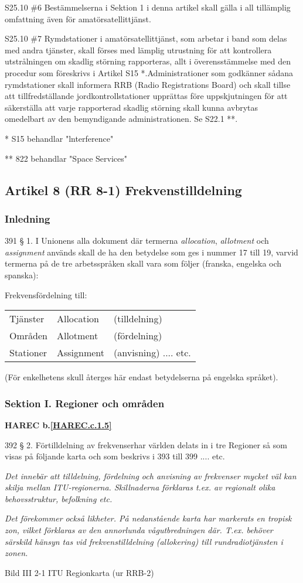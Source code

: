 S25.10 \#6 Bestämmelserna i Sektion 1 i denna artikel skall gälla i all
tillämplig omfattning även för amatörsatellittjänst.

S25.10 \#7 Rymdstationer i amatörsatellittjänst, som arbetar i band som
delas med andra tjänster, skall förses med lämplig utrustning för att
kontrollera utstrålningen om skadlig störning rapporteras, allt i
överensstämmelse med den procedur som föreskrivs i Artikel S15
*.Administrationer som godkänner sådana rymdstationer skall informera
RRB (Radio Registrations Board) och skall tillse att tillfredställande
jordkontrollstationer upprättas före uppskjutningen för att
säkerställa att varje rapporterad skadlig störning skall kunna
avbrytas omedelbart av den bemyndigande administrationen. Se S22.1 **.

* S15 behandlar "lnterference"

** 822 behandlar "Space Services"

\subsection{Artikel 8 (RR 8-1) Frekvenstilldelning}

\subsubsection{Inledning}

391 § 1. I Unionens alla dokument där termerna \emph{allocation},
\emph{allotment} och \emph{assignment} används skall de ha den
betydelse som ges i nummer 17 till 19, varvid termerna på de tre
arbetsspråken skall vara som följer (franska, engelska och spanska):

Frekvensfördelning till:
\begin{tabular}{lll}
  Tjänster & Allocation & (tilldelning) \\
  Områden & Allotment & (fördelning) \\
  Stationer & Assignment & (anvisning) .... etc. \\
\end{tabular}
(För enkelhetens skull återges här endast
betydelserna på engelska språket).

\subsubsection{Sektion I. Regioner och områden}
\textbf{
HAREC b.\ref{HAREC.c.1.5}\label{myHAREC.c.1.5}
}

392 § 2. Förtilldelning av frekvenserhar världen delats in i tre
Regioner så som visas på följande karta och som beskrivs i 393 till
399 .... etc.

\emph{ Det innebär att tilldelning, fördelning och anvisning av
  frekvenser mycket väl kan skilja mellan ITU-regionerna. Skillnaderna
  förklaras t.ex. av regionalt olika behovsstruktur, befolkning etc.}

\emph{Det förekommer också likheter. På nedanstående karta har
  markerats en tropisk zon, vilket förklaras av den annorlunda
  vågutbredningen där. T.ex. behöver särskild hänsyn tas vid
  frekvenstilldelning (allokering) till rundradiotjänsten i zonen.}

Bild III 2-1 ITU Regionkarta (ur RRB-2)
